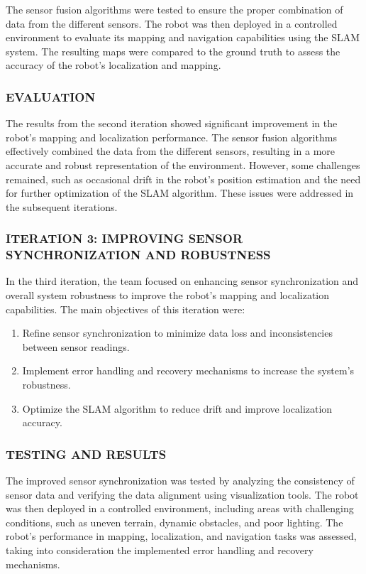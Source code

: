 \documentclass[12pt]{article}
\begin{document}
The sensor fusion algorithms were tested to ensure the proper combination of data from the different sensors. The robot was then deployed in a controlled environment to evaluate its mapping and navigation capabilities using the SLAM system. The resulting maps were compared to the ground truth to assess the accuracy of the robot's localization and mapping.

\subsubsection{EVALUATION}

The results from the second iteration showed significant improvement in the robot's mapping and localization performance. The sensor fusion algorithms effectively combined the data from the different sensors, resulting in a more accurate and robust representation of the environment. However, some challenges remained, such as occasional drift in the robot's position estimation and the need for further optimization of the SLAM algorithm. These issues were addressed in the subsequent iterations.

\subsubsection{ITERATION 3: IMPROVING SENSOR SYNCHRONIZATION AND ROBUSTNESS}

In the third iteration, the team focused on enhancing sensor synchronization and overall system robustness to improve the robot's mapping and localization capabilities. The main objectives of this iteration were:

\begin{enumerate}
    \item Refine sensor synchronization to minimize data loss and inconsistencies between sensor readings.
    \item Implement error handling and recovery mechanisms to increase the system's robustness.
    \item Optimize the SLAM algorithm to reduce drift and improve localization accuracy.
\end{enumerate}

\subsubsection{TESTING AND RESULTS}

The improved sensor synchronization was tested by analyzing the consistency of sensor data and verifying the data alignment using visualization tools. The robot was then deployed in a controlled environment, including areas with challenging conditions, such as uneven terrain, dynamic obstacles, and poor lighting. The robot's performance in mapping, localization, and navigation tasks was assessed, taking into consideration the implemented error handling and recovery mechanisms.
\end{document}
